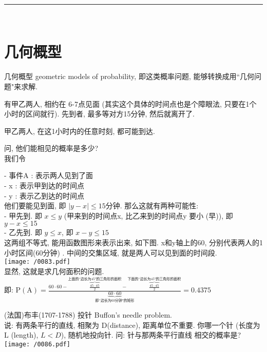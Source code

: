 \documentclass[UTF8]{ctexart}
\begin{document}
~\\
\hrule
~\\


\section{几何概型}


几何概型 geometric models of probability, 即这类概率问题, 能够转换成用``几何问题"来求解.

\begin{myEnvSample}
	有甲乙两人, 相约在 6-7点见面 (其实这个具体的时间点也是个障眼法, 只要在1个小时的区间就行). 先到者, 最多等对方15分钟, 然后就离开了.
	
	甲乙两人, 在这1小时内的任意时刻, 都可能到达.
	
	问, 他们能相见的概率是多少? \\
	
	我们令 
	
	- 事件A : 表示两人见到了面 \\
	- x : 表示甲到达的时间点 \\
	- y : 表示乙到达的时间点 \\
	
	他们要能见到面, 即 $|y-x| \leq 15$分钟. 那么这就有两种可能性: \\
	-  甲先到. 即 $x \leq y$ (甲来到的时间点x, 比乙来到的时间点y 要小 (早)), 即 $ y-x \leq 15$ \\
	-  乙先到. 即 $y \leq x$, 即 $ x-y \leq 15$ \\	
	
	这两组不等式, 能用函数图形来表示出来, 如下图. x和y轴上的60, 分别代表两人的1小时区间(60分钟) . 中间的交集区域, 就是两人可以见到面的时间段. \\
	\texttt{[image: /0083.pdf]} \\
	
	显然, 这就是求几何面积的问题. \\
	
	即: $
	\text{P}\left( \text{A} \right) =\frac{60\cdot 60-\overset{\text{上面的``边长为45"的三角形的面积}}{\overbrace{\frac{45\cdot 45}{2}}}-\overset{\text{下面的``边长为45"的三角形的面积}}{\overbrace{\frac{45\cdot 45}{2}}}}{\underset{\text{即``边长为60分钟"的矩形}}{\underbrace{60\cdot 60}}}=0.4375
	$
\end{myEnvSample} 



\newpage

\begin{myEnvSample}
	(法国)布丰(1707-1788) 投针 Buffon's needle problem. \\
说: 有两条平行的直线, 相聚为 D(distance), 距离单位不重要. 你哪一个针 (长度为 L (length), $L<D$), 随机地投向针. 问: 针与那两条平行直线 相交的概率是? \\

\texttt{[image: /0086.pdf]} \\
\end{myEnvSample} 
\end{document}
